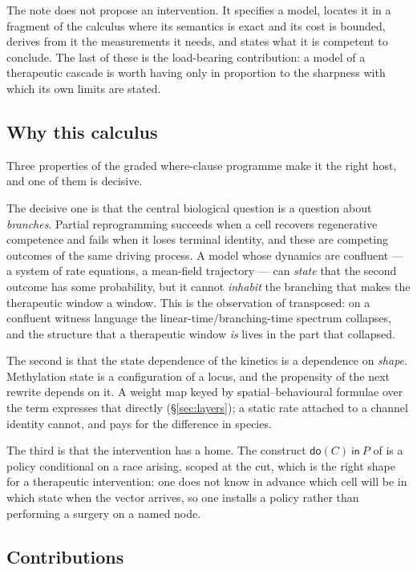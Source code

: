 \documentclass[11pt,a4paper]{article}
\theoremstyle{plain}
\theoremstyle{definition}
\theoremstyle{remark}
\newcommand{\dok}{\textsf{do}}
\newcommand{\ink}{\textsf{in}}
\begin{document}
The note does not propose an intervention. It specifies a model, locates it in
a fragment of the calculus where its semantics is exact and its cost is
bounded, derives from it the measurements it needs, and states what it is
competent to conclude. The last of these is the load-bearing contribution: a
model of a therapeutic cascade is worth having only in proportion to the
sharpness with which its own limits are stated.

\subsection{Why this calculus}

Three properties of the graded where-clause programme make it the right host,
and one of them is decisive.

The decisive one is that the central biological question is a question about
\emph{branches}. Partial reprogramming succeeds when a cell recovers
regenerative competence and fails when it loses terminal identity, and these
are competing outcomes of the same driving process. A model whose dynamics are
confluent --- a system of rate equations, a mean-field trajectory --- can
\emph{state} that the second outcome has some probability, but it cannot
\emph{inhabit} the branching that makes the therapeutic window a window. This
is the observation of \cite{Inhabiting} transposed: on a confluent witness
language the linear-time/branching-time spectrum collapses, and the structure
that a therapeutic window \emph{is} lives in the part that collapsed.

The second is that the state dependence of the kinetics is a dependence on
\emph{shape}. Methylation state is a configuration of a locus, and the
propensity of the next rewrite depends on it. A weight map keyed by
spatial--behavioural formulae over the term expresses that directly
(\S\ref{sec:layers}); a static rate attached to a channel identity cannot, and
pays for the difference in species.

The third is that the intervention has a home. The construct
$\dok(C)\ \ink\ P$ of \cite{Interventions} is a policy conditional on a race
arising, scoped at the cut, which is the right shape for a therapeutic
intervention: one does not know in advance which cell will be in which state
when the vector arrives, so one installs a policy rather than performing a
surgery on a named node.

\subsection{Contributions}
\end{document}
